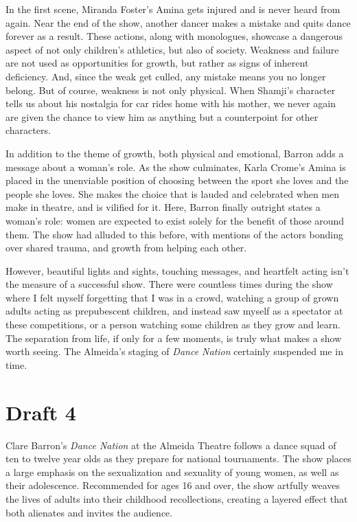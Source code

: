 \documentclass[12pt]{article}[titlepage]
\newcommand{\1}{\={a}}
\newcommand{\2}{\={e}}
\newcommand{\3}{\={\i}}
\newcommand{\4}{\=o}
\newcommand{\5}{\=u}
\newcommand{\6}{\={A}}
\renewcommand{\,}{\textsuperscript{,}}
\begin{document}
In the first scene, Miranda Foster's Amina gets injured and is never heard from again.
Near the end of the show, another dancer makes a mistake and quits dance forever as a result.
These actions, along with monologues, showcase a dangerous aspect of not only children's athletics, but also of society.
Weakness and failure are not used as opportunities for growth, but rather as signs of inherent deficiency.
And, since the weak get culled, any mistake means you no longer belong.
But of course, weakness is not only physical.
When Shamji's character tells us about his nostalgia for car rides home with his mother, we never again are given the chance to view him as anything but a counterpoint for other characters.

In addition to the theme of growth, both physical and emotional, Barron adds a message about a woman's role.
As the show culminates, Karla Crome's Amina is placed in the unenviable position of choosing between the sport she loves and the people she loves.
She makes the choice that is lauded and celebrated when men make in theatre, and is vilified for it.
Here, Barron finally outright states a woman's role: women are expected to exist solely for the benefit of those around them.
The show had alluded to this before, with mentions of the actors bonding over shared trauma, and growth from helping each other.

However, beautiful lights and sights, touching messages, and heartfelt acting isn't the measure of a successful show.
There were countless times during the show where I felt myself forgetting that I was in a crowd, watching a group of grown adults acting as prepubescent children, and instead saw myself as a spectator at these competitions, or a person watching some children as they grow and learn.
The separation from life, if only for a few moments, is truly what makes a show worth seeing.
The Almeida's staging of \textit{Dance Nation} certainly suspended me in time.
\section{Draft 4}
Clare Barron's \textit{Dance Nation} at the Almeida Theatre follows a dance squad of ten to twelve year olds as they prepare for national tournaments.
The show places a large emphasis on the sexualization and sexuality of young women, as well as their adolescence.
Recommended for ages 16 and over, the show artfully weaves the lives of adults into their childhood recollections, creating a layered effect that both alienates and invites the audience.
\end{document}
